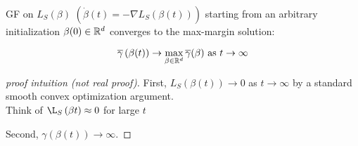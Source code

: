 \begin{theorem}
    GF on \(L_S (\beta)\)   \(\left( \dot{\beta}(t) = - \nabla L_S \left( \beta(t)\right) \right)\) starting 
    from an arbitrary initialization \(\beta(0) \in \mathbb{R}^d\) converges to the max-margin solution: 

    \[
        \overline{\gamma} \left( \beta(t) \right) \to \max_{\beta \in \mathbb{R}^d} \overline{\gamma} (\beta) 
        \text{   as } t \to \infty 
    \] 
\end{theorem}

\begin{proof}[proof intuition (not real proof)]
    First, \(L_S \left( \beta (t)\right) \to 0\) as \(t \to \infty\) by a standard smooth convex 
    optimization argument.  \\ 
    Think of \(\L_S \left( \beta{t} \right) \approx 0\) for large \(t\) 

    Second, \(\gamma \left( \beta(t) \right) \to \infty\). 
\end{proof}